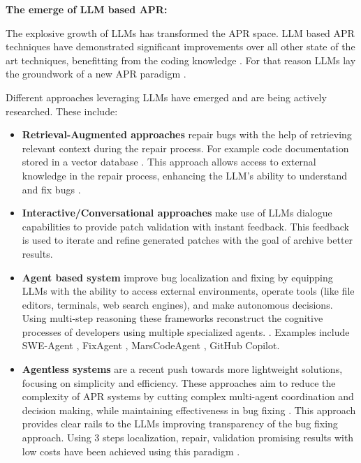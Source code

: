 \textbf{The emerge of LLM based APR:}

The explosive growth of LLMs has transformed the APR space. LLM based APR techniques have demonstrated significant improvements over all other state of the art techniques, benefitting from the coding knowledge \cite{hossainDeepDiveLarge2024}. For that reason LLMs lay the groundwork of a new APR paradigm \cite{chenUnveilingPitfallsUnderstanding2025, anandComprehensiveSurveyAIDriven2024}.

Different approaches leveraging LLMs have emerged and are being actively researched. These include:

\begin{itemize}
    \item \textbf{Retrieval-Augmented approaches} repair bugs with the help of retrieving relevant context during the repair process. For example code documentation stored in a vector database \cite{puvvadiCodingAgentsComprehensive2025}. This approach allows access to  external knowledge in the repair process, enhancing the LLM's ability to understand and fix bugs \cite{houLargeLanguageModels2024, yinThinkRepairSelfDirectedAutomated2024}.

    \item \textbf{Interactive/Conversational approaches} make use of LLMs dialogue capabilities to provide patch validation with instant feedback. \cite{xiaAutomatedProgramRepair2024, huCanGPTO1Kill2024} This feedback is used to iterate and refine generated patches with the goal of archive better results. \cite{xiaAutomatedProgramRepair2024}

    \item \textbf{Agent based system} improve bug localization and fixing by equipping LLMs with the ability to access external environments, operate tools (like file editors, terminals, web search engines), and make autonomous decisions. \cite{anandComprehensiveSurveyAIDriven2024, puvvadiCodingAgentsComprehensive2025, mengEmpiricalStudyLLMbased2024} Using multi-step reasoning these frameworks reconstruct the cognitive processes of developers using multiple specialized agents. \cite{rondonEvaluatingAgentbasedProgram2025,zhangPATCHEmpoweringLarge2025, leeUnifiedDebuggingApproach2024}. Examples include SWE-Agent \cite{yangSWEagentAgentComputerInterfaces2024}, FixAgent \cite{leeUnifiedDebuggingApproach2024}, MarsCodeAgent \cite{liuMarsCodeAgentAInative2024}, GitHub Copilot.

    \item \textbf{Agentless systems} are a recent push towards more lightweight solutions, focusing on simplicity and efficiency. These approaches aim to reduce the complexity of APR systems by cutting complex multi-agent coordination and decision making, while maintaining effectiveness in bug fixing \cite{xiaAgentlessDemystifyingLLMbased2024,puvvadiCodingAgentsComprehensive2025}. This approach provides clear rails to the LLMs improving transparency of the bug fixing approach. Using 3 steps localization, repair, validation promising results with low costs have been achieved using this paradigm \cite{xiaAgentlessDemystifyingLLMbased2024, mengEmpiricalStudyLLMbased2024}.
\end{itemize}

